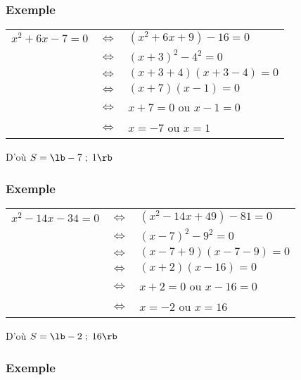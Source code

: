 \subsubsection{Exemple }

\begin{tabular}{lll}
$x^2 + 6x - 7 = 0$ & $\Longleftrightarrow$ & $\left(x^2 + 6x + 9\right) - 16 = 0 $ \\
& $\Longleftrightarrow$ & $\left(x + 3\right)^2 - 4^2 = 0$ \\
& $\Longleftrightarrow$ & $\left(x + 3 + 4\right)\left(x + 3 - 4 \right) = 0 $ \\
& $\Longleftrightarrow$ & $\left(x + 7\right)\left(x - 1\right) = 0 $ \\
& $\Longleftrightarrow$ & $x + 7 = 0 $ ou $x - 1 = 0$ \\
& $\Longleftrightarrow$ & $ x = -7 $ ou $x = 1$ \\
\end{tabular}

\vspace*{.3cm}

D'où $S = \lb -7 \; ; \; 1 \rb$ 

\subsubsection{Exemple }

\begin{tabular}{lll}
$x^2 - 14x - 34 = 0 $ & $\Longleftrightarrow$ & $\left(x^2 - 14x + 49\right) - 81 = 0$ \\
& $\Longleftrightarrow$ & $\left(x-7\right)^2 - 9^2 = 0 $ \\
& $\Longleftrightarrow$ & $\left(x-7 + 9\right)\left(x-7 - 9\right) = 0$ \\
& $\Longleftrightarrow$ & $\left(x + 2\right)\left(x - 16\right) = 0$ \\
& $\Longleftrightarrow$ & $x + 2 = 0$ ou $x - 16 = 0$ \\
& $\Longleftrightarrow$ & $x = -2$ ou $x = 16$ \\
\end{tabular}

\vspace*{.3cm}

D'où $S = \lb -2 \; ; \; 16 \rb $ 

\subsubsection{Exemple }

